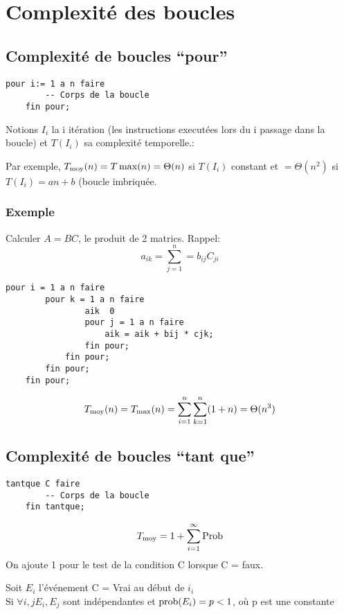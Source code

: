 \chapter{Complexité des boucles}
	\section{Complexité de boucles ``pour''}
\begin{lstlisting}[language=algo]
	pour i:= 1 a n faire
		-- Corps de la boucle
	fin pour;
\end{lstlisting}
Notions $I_i$ la i\ieme{} itération (les instructions executées lors du i\ieme{} passage dans la boucle) et $T(I_i)$ sa complexité temporelle.:

Par exemple, $T_\moy(n) = T\max(n) = \Theta(n)$ si $T(I_i)$ constant et $= \Theta(n^2)$ si $T(I_i) = an+b$ (boucle imbriquée.

\subsection{Exemple}
Calculer $A=BC$, le produit de 2 matrics. Rappel:
$$a_{ik} = \sum^n_{j=1} = b_{ij}C_{ji}$$
\begin{lstlisting}[language=algo]
	pour i = 1 a n faire
		pour k = 1 a n faire
				aik  0
				pour j = 1 a n faire
					aik = aik + bij * cjk;
				fin pour;
			fin pour;
		fin pour;
	fin pour;
\end{lstlisting}

$$T_{\moy}(n) = T_{\max}(n) = \sum^n_{i=1}\sum^n_{k=1}(1+n) = \Theta(n^3)$$

\newpage
\section{Complexité de boucles ``tant que''}

\begin{lstlisting}[language=algo]
	tantque C faire
		-- Corps de la boucle
	fin tantque;
\end{lstlisting}
$$T_{\moy} = 1 + \sum^\infty_{i=1}\textrm{Prob}$$
On ajoute 1 pour le test de la condition C lorsque C = faux.

Soit $E_i$ l'événement C = Vrai au début de $i_i$\\
Si $\forall i, j E_i, E_j$ sont indépendantes et $\prob(E_i) = p < 1$, où p est une constante

